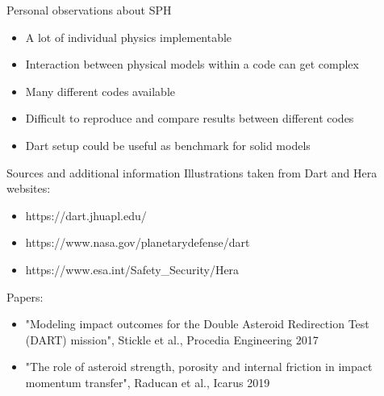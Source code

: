 \documentclass{beamer}
\begin{document}
\begin{frame}{Personal observations about SPH}
	\begin{itemize}[<+->]
		\item A lot of individual physics implementable
		\item Interaction between physical models within a code can get complex
		\item Many different codes available
		\item Difficult to reproduce and compare results between different codes
		\item Dart setup could be useful as benchmark for solid models
	\end{itemize}
\end{frame}

\begin{frame}{Sources and additional information}
	Illustrations taken from Dart and Hera websites:
	\begin{itemize}
		\item https://dart.jhuapl.edu/
		\item https://www.nasa.gov/planetarydefense/dart
		\item https://www.esa.int/Safety\_Security/Hera
	\end{itemize}
	Papers:
	\begin{itemize}
		\item "Modeling impact outcomes for the Double Asteroid Redirection Test (DART) mission", Stickle et al., Procedia Engineering 2017
		\item "The role of asteroid strength, porosity and internal friction in impact momentum transfer", Raducan et al., Icarus 2019
	\end{itemize}
\end{frame}
\end{document}
